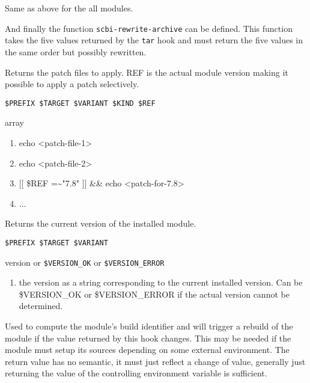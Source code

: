 \documentclass[a4paper,12pt,twoside]{article}
\newcommand{\code}[1]{\texttt{#1}}
\begin{document}
\begin{description}[font=\large\texttt]
\begin{description}[style=standard]
		\item[\code{SCBI\_ARCHIVE\_VARIANT}] Same as above for the all modules.
	\end{description}

	And finally the function \code{scbi-rewrite-archive} can be defined. This function takes the five values returned by the \code{tar} hook and must return the five values in the same order but possibly rewritten.

	\item[<module>{[}-common|<variant>{]}-patches] Returns the patch files to apply. REF is the actual module version making it possible to apply a patch selectively.

	\begin{description}[font=\textit,style=standard]
		\item[parameter] \tabto{2cm} \code{\$PREFIX \$TARGET \$VARIANT \$KIND \$REF}
		\item[return] \tabto{2cm} array
		\begin{enumerate}
			\item echo <patch-file-1>
			\item echo <patch-file-2>
			\item {[}{[} \$REF =\textasciitilde "7.8" {]}{]} \&\& echo <patch-for-7.8>
			\item ...
		\end{enumerate}
	\end{description}

	\item[<module>{[}-<variant>{]}-version] Returns the current version of the installed module.
	\begin{description}[font=\textit,style=standard]
		\item[parameter] \tabto{2cm} \code{\$PREFIX \$TARGET \$VARIANT}
		\item[return] \tabto{2cm} version or \code{\$VERSION\_OK} or \code{\$VERSION\_ERROR}
		\begin{enumerate}
			\item the version as a string corresponding to the current installed version. Can be \$VERSION\_OK or \$VERSION\_ERROR if the actual version cannot be determined.
		\end{enumerate}
	\end{description}

	\item[<module>{[}-common|<variant>{]}-external-env] Used to compute the module's build identifier and will trigger a rebuild of the module if the value returned by this hook changes. This may be needed if the module must setup its sources depending on some external environment. The return value has no semantic, it must just reflect a change of value, generally just returning the value of the controlling environment variable is sufficient.


\end{description}
\end{document}

